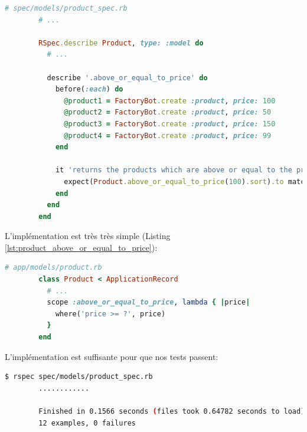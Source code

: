 \documentclass[]{report}
\begin{document}
      \begin{scriptsize}
        \begin{lstlisting}[language=ruby, caption={Test du filtrage des produits par prix supérieur ou égal}, label={lst:product_above_or_equal_to_price_spec}]
        # spec/models/product_spec.rb
        # ...

        RSpec.describe Product, type: :model do
          # ...

          describe '.above_or_equal_to_price' do
            before(:each) do
              @product1 = FactoryBot.create :product, price: 100
              @product2 = FactoryBot.create :product, price: 50
              @product3 = FactoryBot.create :product, price: 150
              @product4 = FactoryBot.create :product, price: 99
            end

            it 'returns the products which are above or equal to the price' do
              expect(Product.above_or_equal_to_price(100).sort).to match_array([@product1, @product3])
            end
          end
        end
        \end{lstlisting}
      \end{scriptsize}

      L'implémentation est très très simple (Listing \ref{lst:product_above_or_equal_to_price}):

      \begin{scriptsize}
        \begin{lstlisting}[language=ruby, caption={Implémentation du filtrage des produits par prix supérieur ou égal}, label={lst:product_above_or_equal_to_price}]
        # app/models/product.rb
        class Product < ApplicationRecord
          # ...
          scope :above_or_equal_to_price, lambda { |price|
            where('price >= ?', price)
          }
        end
        \end{lstlisting}
      \end{scriptsize}

      L'implémentation est suffisante pour que nos tests passent:

      \begin{scriptsize}
        \begin{lstlisting}[language=bash]
        $ rspec spec/models/product_spec.rb
        ............

        Finished in 0.1566 seconds (files took 0.64782 seconds to load)
        12 examples, 0 failures
        \end{lstlisting}
      \end{scriptsize}
\end{document}
